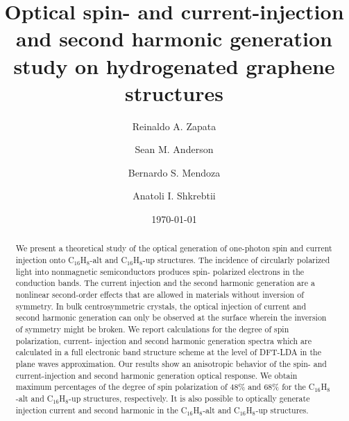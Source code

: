\documentclass[aps,pra,11pt,tightenlines,showpacs,superscriptaddress,groupedaddress]{revtex4-1}
\newcommand{\altstc}{C$_{16}$H$_{8}$-alt}
\newcommand{\upstc}{C$_{16}$H$_{8}$-up}
\begin{document}
\title{Optical spin- and current-injection and second harmonic generation study on hydrogenated graphene structures}

\author{Reinaldo A. Zapata}
\author{Sean M. Anderson}
\author{Bernardo S. Mendoza}
\author{Anatoli I. Shkrebtii}

\date{\today}



\begin{abstract}

We present a theoretical study of the optical generation of one-photon spin and
current injection onto {\altstc} and {\upstc} structures. The incidence of
circularly polarized light into nonmagnetic semiconductors produces spin-
polarized electrons in the conduction bands. The current injection and the
second harmonic generation are a nonlinear second-order effects that are
allowed in materials without inversion of symmetry. In bulk centrosymmetric
crystals, the optical injection of current and second harmonic generation can
only be observed at the surface wherein the inversion of symmetry might be
broken. We report calculations for the degree of spin polarization, current-
injection and second harmonic generation spectra which are calculated in a full
electronic band structure scheme at the level of DFT-LDA in the plane waves
approximation. Our results show an anisotropic behavior of the spin- and
current-injection and second harmonic generation optical response. We obtain
maximum percentages of the degree of spin polarization of 48\% and 68\% for the
{\altstc} and {\upstc} structures, respectively. It is also possible to
optically generate injection current and second harmonic in the {\altstc} and
{\upstc} structures.

\end{abstract}



\maketitle
\end{document}
